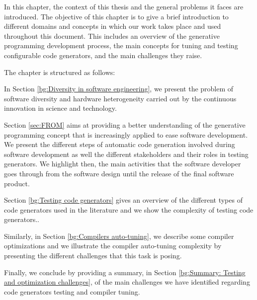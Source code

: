  
In this chapter, the context of this thesis and the general problems it faces are introduced. The objective of this chapter is to give a brief introduction to  different domains and concepts in which our work takes place and used throughout this document.
This includes an overview of the generative programming development process, the main concepts for tuning and testing configurable code generators, and the main challenges they raise.


The chapter is structured as follows: 

In Section \ref{bg:Diversity in software engineering}, we present the problem of software diversity and hardware heterogeneity carried out by the continuous innovation in science and technology.

Section \ref{sec:FROM} aims at providing a better understanding of the generative programming concept that is increasingly applied to ease software development. We present the different steps of automatic code generation involved during software development as well the different stakeholders and their roles in testing generators. We highlight then, the main activities that the software developer goes through from the software design until the release of the final software product.

Section \ref{bg:Testing code generators} gives an overview of the different types of code generators used in the literature and we show the complexity of testing code generators.. 

Similarly, in Section \ref{bg:Compilers auto-tuning}, we describe some compiler optimizations and we illustrate the compiler auto-tuning complexity by presenting the different challenges that this task is posing.

Finally, we conclude by providing a summary, in Section \ref{bg:Summary: Testing and optimization challenges}, of the main challenges we have identified regarding code generators testing and compiler tuning.

